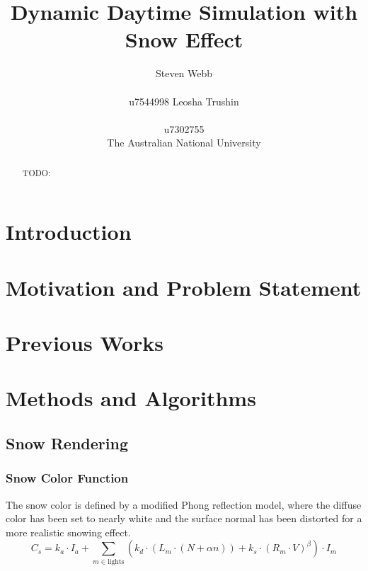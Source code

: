 \documentclass{article}
\title{Dynamic Daytime Simulation with Snow Effect}
\author{%
  Steven Webb\\\\
  u7544998 
   \And
  Leosha Trushin\\\\
  u7302755\\
  \AND  The Australian National University 
}
\begin{document}
\maketitle

\begin{abstract}
TODO:
\end{abstract}

\section{Introduction}

\section{Motivation and Problem Statement}

\section{Previous Works}

\section {Methods and Algorithms}

\subsection {Snow Rendering}

\subsubsection {Snow Color Function}
The snow color is defined by a modified Phong reflection model, where the diffuse color has been set to nearly white 
and the surface normal has been distorted for a more realistic snowing effect.
\[
  C_{s} = k_a \cdot I_a + \sum_{m \in \text{lights}} (k_d \cdot (L_m \cdot (N + \alpha n)) + k_s \cdot (R_m \cdot V)^\beta) \cdot I_m  
\]
\end{document}
